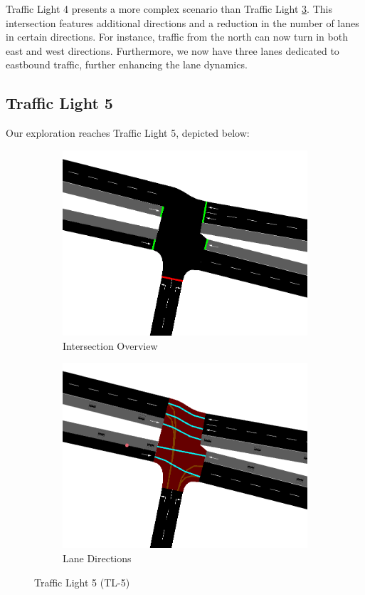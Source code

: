 Traffic Light 4 presents a more complex scenario than Traffic Light \hyperref[sec:tl-3]{3}. This intersection features additional directions and a reduction in the number of lanes in certain directions. For instance, traffic from the north can now turn in both east and west directions. Furthermore, we now have three lanes dedicated to eastbound traffic, further enhancing the lane dynamics.

\subsection{Traffic Light 5} \label{sec:tl-5}
Our exploration reaches Traffic Light 5, depicted below:

\begin{figure}[h]
    \centering
    \begin{subfigure}{0.45\textwidth}
        \centering
        \includegraphics[width=\linewidth]{images/methodology/tl-5-street.png}
        \caption{Intersection Overview}
    \end{subfigure}
    \hfill
    \begin{subfigure}{0.45\textwidth}
        \centering
        \includegraphics[width=\linewidth]{images/methodology/tl-5-directions.png}
        \caption{Lane Directions}
    \end{subfigure}
    \caption{Traffic Light 5 (TL-5)}
    \label{fig:tl-5}
\end{figure}
